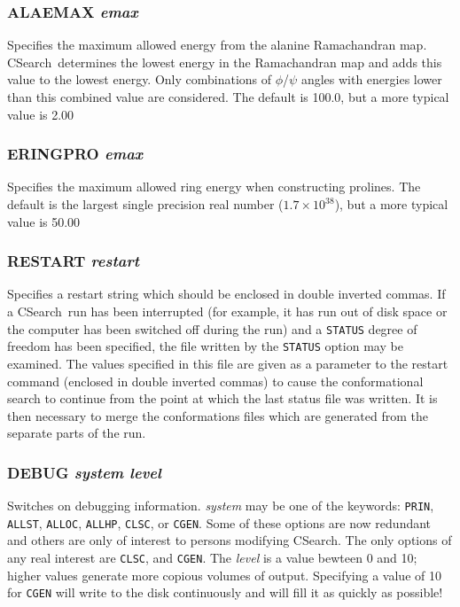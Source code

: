 \documentclass{report}
\newcommand{\cs}{CSearch}
\begin{document}
\subsubsection{ALAEMAX {\em emax}}
Specifies the maximum allowed energy from the alanine Ramachandran map. 
\cs\ determines
the lowest energy in the Ramachandran map and adds this value to the lowest
energy. Only combinations of $\phi$/$\psi$ angles with energies lower than this
combined value are considered. The default is 100.0, but a more typical 
value is 2.00

\subsubsection{ERINGPRO {\em emax}}
Specifies the maximum allowed ring energy when constructing prolines.
The default is the largest single precision real number ($1.7\times10^{38}$),
but a more typical value is 50.00

\subsubsection{RESTART {\em restart}}
Specifies a restart string which should be enclosed in double inverted commas.
If a \cs\ run has been interrupted (for example, it has run out of disk
space or the computer has been switched off during the run) and a {\tt STATUS}
degree of freedom has been specified, the file written by the {\tt STATUS}
option
may be examined. The values specified in this file are given as a parameter
to the restart command (enclosed in double inverted commas) to cause the
conformational search to continue from the point at which the last status file
was written. It is then necessary to merge the conformations files which
are generated from the separate parts of the run.

\subsubsection{DEBUG {\em system level}}
Switches on debugging information. {\em system\/} may be one of the keywords:
{\tt PRIN}, {\tt ALLST}, {\tt ALLOC}, {\tt ALLHP}, {\tt CLSC}, or {\tt CGEN}.
Some of these options are now redundant and others are only of interest to
persons modifying \cs. The only options of any real interest are
{\tt CLSC}, and {\tt CGEN}. The {\em level\/} is a value bewteen 0 and 10;
higher values generate more copious volumes of output. Specifying a value of
10 for {\tt CGEN} will write to the disk continuously and will fill it as
quickly as possible!
\end{document}

